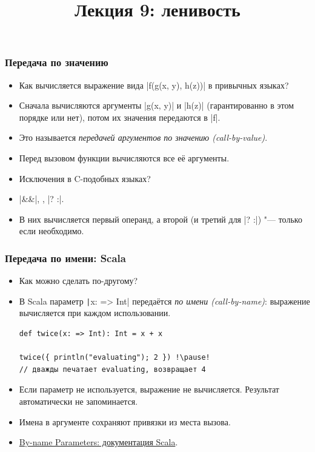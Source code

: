 \documentclass[11pt]{beamer}
\title{Лекция 9: ленивость}
\begin{document}
\begin{frame}[plain]
  \maketitle
\end{frame}

\begin{frame}[fragile]
  \frametitle{Передача по значению}
  \begin{itemize}
    \item Как вычисляется выражение вида \haskinline|f(g(x, y), h(z))| в привычных языках?
          \pause
    \item Сначала вычисляются аргументы \haskinline|g(x, y)| и \haskinline|h(z)| (гарантированно в этом порядке или нет), потом их значения передаются в \haskinline|f|.
    \item Это называется \emph{передачей аргументов по значению (call-by-value)}.
    \item Перед вызовом функции вычисляются все её аргументы.
    \item Исключения в C-подобных языках?
          \pause
    \item \haskinline|&&|, \haskinline{||}, \haskinline|? :|.
          \pause
    \item В них вычисляется первый операнд, а второй (и третий для \haskinline|? :|) "--- только если необходимо.
  \end{itemize}
\end{frame}

\begin{frame}[fragile]
  \frametitle{Передача по имени: Scala}
  \begin{itemize}
    \item Как можно сделать по-другому?
          \pause
    \item В Scala параметр \texttt|x: => Int| передаётся \emph{по имени (call-by-name)}: выражение вычисляется при каждом использовании.
          \begin{verbatim}
def twice(x: => Int): Int = x + x

twice({ println("evaluating"); 2 }) !\pause!
// дважды печатает evaluating, возвращает 4
          \end{verbatim}
          \pause
    \item Если параметр не используется, выражение не вычисляется. Результат автоматически не запоминается.
    \item Имена в аргументе сохраняют привязки из места вызова.
    \item \href{https://docs.scala-lang.org/tour/by-name-parameters.html}{By-name Parameters: документация Scala}.
  \end{itemize}
\end{frame}
\end{document}

